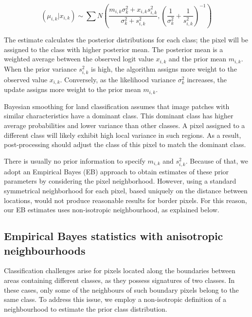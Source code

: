 \documentclass[
  shortnames]{jss}
\begin{document}
\begin{equation}
(\mu_{i,k} | x_{i,k}) \sim \sum N\left(  \frac{m_{i,k} \sigma^2_{k} +
    x_{i,k} s^2_{i,k}}{ \sigma^2_{k} +s^2_{i,k}} , \left( \frac{1}{\sigma_k^2} + \frac{1}{s^2_{i,k}} \right)^{-1} \right) 
\label{eq:BayesUpdate}
\end{equation}

The estimate calculates the posterior distributions for each class; the pixel will be assigned to the class with higher posterior mean. The posterior mean is a weighted average between the observed logit value \(x_{i,k}\) and the prior mean \(m_{i,k}\). When the prior variance \(s^2_{i,k}\) is high, the algorithm assigns more weight to the observed value \(x_{i,k}\). Conversely, as the likelihood variance \(\sigma^2_k\) increases, the update assigns more weight to the prior mean \(m_{i,k}\).

Bayesian smoothing for land classification assumes that image patches with similar characteristics have a dominant class. This dominant class has higher average probabilities and lower variance than other classes. A pixel assigned to a different class will likely exhibit high local variance in such regions. As a result, post-processing should adjust the class of this pixel to match the dominant class.

There is usually no prior information to specify \(m_{i,k}\) and \(s^2_{i,k}\). Because of that, we adopt an Empirical Bayes (EB) approach to obtain estimates of these prior parameters by considering the pixel neighborhood. However, using a standard symmetrical neighborhood for each pixel, based uniquely on the distance between locations, would not produce reasonable results for border pixels. For this reason, our EB estimates uses non-isotropic neighbourhood, as explained below.

\subsection{Empirical Bayes statistics with anisotropic neighbourhoods}\label{empirical-bayes-statistics-with-anisotropic-neighbourhoods}

Classification challenges arise for pixels located along the boundaries between areas containing different classes, as they possess signatures of two classes. In these cases, only some of the neighbours of such boundary pixels belong to the same class. To address this issue, we employ a non-isotropic definition of a neighbourhood to estimate the prior class distribution.
\end{document}

